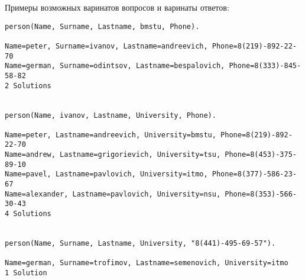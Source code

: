Примеры возможных варинатов вопросов и варинаты ответов:
\begin{lstlisting}
person(Name, Surname, Lastname, bmstu, Phone).

Name=peter, Surname=ivanov, Lastname=andreevich, Phone=8(219)-892-22-70
Name=german, Surname=odintsov, Lastname=bespalovich, Phone=8(333)-845-58-82
2 Solutions


person(Name, ivanov, Lastname, University, Phone).

Name=peter, Lastname=andreevich, University=bmstu, Phone=8(219)-892-22-70
Name=andrew, Lastname=grigorievich, University=tsu, Phone=8(453)-375-89-10
Name=pavel, Lastname=pavlovich, University=itmo, Phone=8(377)-586-23-67
Name=alexander, Lastname=pavlovich, University=nsu, Phone=8(353)-566-30-43
4 Solutions


person(Name, Surname, Lastname, University, "8(441)-495-69-57").

Name=german, Surname=trofimov, Lastname=semenovich, University=itmo
1 Solution
\end{lstlisting}